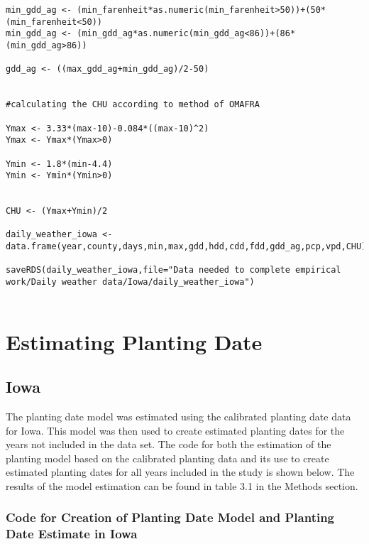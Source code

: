 \begin{lstlisting}
min_gdd_ag <- (min_farenheit*as.numeric(min_farenheit>50))+(50*(min_farenheit<50))
min_gdd_ag <- (min_gdd_ag*as.numeric(min_gdd_ag<86))+(86*(min_gdd_ag>86))

gdd_ag <- ((max_gdd_ag+min_gdd_ag)/2-50)


#calculating the CHU according to method of OMAFRA

Ymax <- 3.33*(max-10)-0.084*((max-10)^2)
Ymax <- Ymax*(Ymax>0)

Ymin <- 1.8*(min-4.4)
Ymin <- Ymin*(Ymin>0)


CHU <- (Ymax+Ymin)/2

daily_weather_iowa <- data.frame(year,county,days,min,max,gdd,hdd,cdd,fdd,gdd_ag,pcp,vpd,CHU)

saveRDS(daily_weather_iowa,file="Data needed to complete empirical work/Daily weather data/Iowa/daily_weather_iowa")


\end{lstlisting}


\section{Estimating Planting Date}

\subsection{Iowa}

The planting date model was estimated using the calibrated planting date data for Iowa. This model was then used to create estimated planting dates for the years not included in the data set. The code for both the estimation of the planting model based on the calibrated planting data and its use to create estimated planting dates for all years included in the study is shown below. The results of the model estimation can be found in table 3.1 in the Methods section.

\subsubsection{Code for Creation of Planting Date Model and Planting Date Estimate in Iowa}



